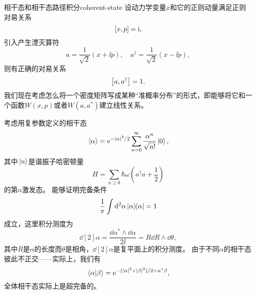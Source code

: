 \begin{back}{相干态和相干态路径积分}{coherent-state}
    设动力学变量$x$和它的正则动量满足正则对易关系
    \begin{equation}
        \comm{x}{p} = \ii,
    \end{equation}
    引入产生湮灭算符
    \begin{equation}
        a = \frac{1}{\sqrt{2}} (x + \ii p), \quad a^\dagger = \frac{1}{\sqrt{2}} (x - \ii p),
    \end{equation}
    则有正确的对易关系
    \begin{equation}
        \comm{a}{a^\dagger} = 1.
    \end{equation}
    我们现在考虑怎么将一个密度矩阵写成某种“准概率分布”的形式，即能够将它和一个函数$W(x, p)$或者$W(a, a^*)$建立线性关系。

    考虑用复参数定义的相干态
    \begin{equation}
        \ket*{\alpha} = \mathrm{e}^{- \abs*{\alpha}^2 / 2} \sum_{n = 0}^\infty \frac{\alpha^n}{\sqrt{n!}} \ket*{0},
    \end{equation}
    其中$\ket*{n}$是谐振子哈密顿量
    \begin{equation}
        H = \sum_{n \geq 0} \hbar \omega \left( a^\dagger a + \frac{1}{2} \right) 
    \end{equation}
    的第$n$激发态。
    能够证明完备条件
    \begin{equation}
        \frac{1}{\pi} \int \dd[2]{\alpha} \dyad{\alpha} = 1
    \end{equation}
    成立，这里积分测度为
    \begin{equation}
        \dd[2]{\alpha} = \frac{\dd{\alpha^*} \wedge \dd{\alpha}}{2 \ii} = R \dd{R} \wedge \dd{\theta},
    \end{equation}
    其中$R$是$\alpha$的长度而$\theta$是相角，$\dd[2]{\alpha}$是复平面上的积分测度。
    由于不同$\alpha$的相干态彼此不正交——实际上，我们有
    \begin{equation}
        \braket*{\alpha}{\beta} = \mathrm{e}^{- (\abs{\alpha}^2 + \abs{\beta}^2) / 2 + \alpha^* \beta},
    \end{equation}
    全体相干态实际上是超完备的。

\end{back}
